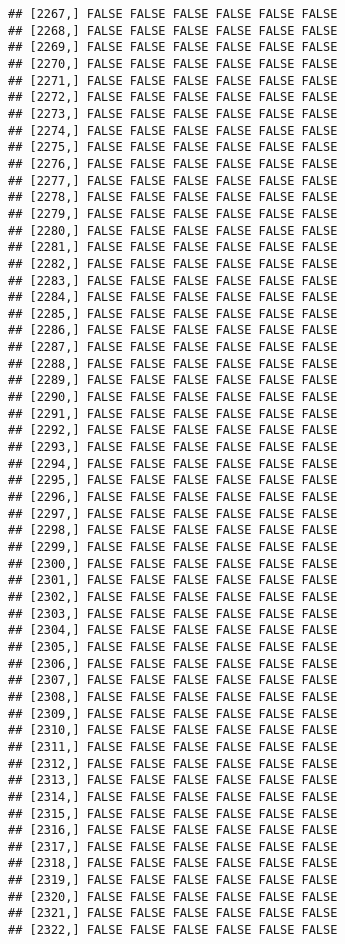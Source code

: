 \documentclass[
]{article}
\begin{document}
\begin{verbatim}
## [2267,] FALSE FALSE FALSE FALSE FALSE FALSE
## [2268,] FALSE FALSE FALSE FALSE FALSE FALSE
## [2269,] FALSE FALSE FALSE FALSE FALSE FALSE
## [2270,] FALSE FALSE FALSE FALSE FALSE FALSE
## [2271,] FALSE FALSE FALSE FALSE FALSE FALSE
## [2272,] FALSE FALSE FALSE FALSE FALSE FALSE
## [2273,] FALSE FALSE FALSE FALSE FALSE FALSE
## [2274,] FALSE FALSE FALSE FALSE FALSE FALSE
## [2275,] FALSE FALSE FALSE FALSE FALSE FALSE
## [2276,] FALSE FALSE FALSE FALSE FALSE FALSE
## [2277,] FALSE FALSE FALSE FALSE FALSE FALSE
## [2278,] FALSE FALSE FALSE FALSE FALSE FALSE
## [2279,] FALSE FALSE FALSE FALSE FALSE FALSE
## [2280,] FALSE FALSE FALSE FALSE FALSE FALSE
## [2281,] FALSE FALSE FALSE FALSE FALSE FALSE
## [2282,] FALSE FALSE FALSE FALSE FALSE FALSE
## [2283,] FALSE FALSE FALSE FALSE FALSE FALSE
## [2284,] FALSE FALSE FALSE FALSE FALSE FALSE
## [2285,] FALSE FALSE FALSE FALSE FALSE FALSE
## [2286,] FALSE FALSE FALSE FALSE FALSE FALSE
## [2287,] FALSE FALSE FALSE FALSE FALSE FALSE
## [2288,] FALSE FALSE FALSE FALSE FALSE FALSE
## [2289,] FALSE FALSE FALSE FALSE FALSE FALSE
## [2290,] FALSE FALSE FALSE FALSE FALSE FALSE
## [2291,] FALSE FALSE FALSE FALSE FALSE FALSE
## [2292,] FALSE FALSE FALSE FALSE FALSE FALSE
## [2293,] FALSE FALSE FALSE FALSE FALSE FALSE
## [2294,] FALSE FALSE FALSE FALSE FALSE FALSE
## [2295,] FALSE FALSE FALSE FALSE FALSE FALSE
## [2296,] FALSE FALSE FALSE FALSE FALSE FALSE
## [2297,] FALSE FALSE FALSE FALSE FALSE FALSE
## [2298,] FALSE FALSE FALSE FALSE FALSE FALSE
## [2299,] FALSE FALSE FALSE FALSE FALSE FALSE
## [2300,] FALSE FALSE FALSE FALSE FALSE FALSE
## [2301,] FALSE FALSE FALSE FALSE FALSE FALSE
## [2302,] FALSE FALSE FALSE FALSE FALSE FALSE
## [2303,] FALSE FALSE FALSE FALSE FALSE FALSE
## [2304,] FALSE FALSE FALSE FALSE FALSE FALSE
## [2305,] FALSE FALSE FALSE FALSE FALSE FALSE
## [2306,] FALSE FALSE FALSE FALSE FALSE FALSE
## [2307,] FALSE FALSE FALSE FALSE FALSE FALSE
## [2308,] FALSE FALSE FALSE FALSE FALSE FALSE
## [2309,] FALSE FALSE FALSE FALSE FALSE FALSE
## [2310,] FALSE FALSE FALSE FALSE FALSE FALSE
## [2311,] FALSE FALSE FALSE FALSE FALSE FALSE
## [2312,] FALSE FALSE FALSE FALSE FALSE FALSE
## [2313,] FALSE FALSE FALSE FALSE FALSE FALSE
## [2314,] FALSE FALSE FALSE FALSE FALSE FALSE
## [2315,] FALSE FALSE FALSE FALSE FALSE FALSE
## [2316,] FALSE FALSE FALSE FALSE FALSE FALSE
## [2317,] FALSE FALSE FALSE FALSE FALSE FALSE
## [2318,] FALSE FALSE FALSE FALSE FALSE FALSE
## [2319,] FALSE FALSE FALSE FALSE FALSE FALSE
## [2320,] FALSE FALSE FALSE FALSE FALSE FALSE
## [2321,] FALSE FALSE FALSE FALSE FALSE FALSE
## [2322,] FALSE FALSE FALSE FALSE FALSE FALSE

\end{verbatim}
\end{document}
